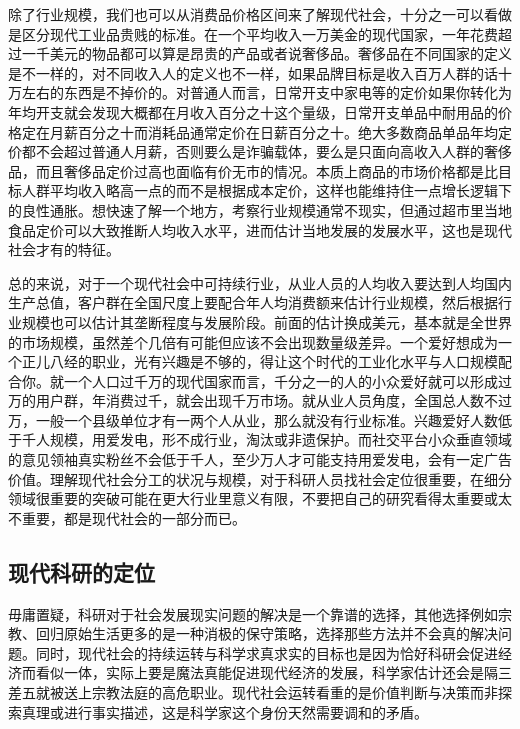 \documentclass[]{tufte-book}
\begin{document}
除了行业规模，我们也可以从消费品价格区间来了解现代社会，十分之一可以看做是区分现代工业品贵贱的标准。在一个平均收入一万美金的现代国家，一年花费超过一千美元的物品都可以算是昂贵的产品或者说奢侈品。奢侈品在不同国家的定义是不一样的，对不同收入人的定义也不一样，如果品牌目标是收入百万人群的话十万左右的东西是不掉价的。对普通人而言，日常开支中家电等的定价如果你转化为年均开支就会发现大概都在月收入百分之十这个量级，日常开支单品中耐用品的价格定在月薪百分之十而消耗品通常定价在日薪百分之十。绝大多数商品单品年均定价都不会超过普通人月薪，否则要么是诈骗载体，要么是只面向高收入人群的奢侈品，而且奢侈品定价过高也面临有价无市的情况。本质上商品的市场价格都是比目标人群平均收入略高一点的而不是根据成本定价，这样也能维持住一点增长逻辑下的良性通胀。想快速了解一个地方，考察行业规模通常不现实，但通过超市里当地食品定价可以大致推断人均收入水平，进而估计当地发展的发展水平，这也是现代社会才有的特征。

总的来说，对于一个现代社会中可持续行业，从业人员的人均收入要达到人均国内生产总值，客户群在全国尺度上要配合年人均消费额来估计行业规模，然后根据行业规模也可以估计其垄断程度与发展阶段。前面的估计换成美元，基本就是全世界的市场规模，虽然差个几倍有可能但应该不会出现数量级差异。一个爱好想成为一个正儿八经的职业，光有兴趣是不够的，得让这个时代的工业化水平与人口规模配合你。就一个人口过千万的现代国家而言，千分之一的人的小众爱好就可以形成过万的用户群，年消费过千，就会出现千万市场。就从业人员角度，全国总人数不过万，一般一个县级单位才有一两个人从业，那么就没有行业标准。兴趣爱好人数低于千人规模，用爱发电，形不成行业，淘汰或非遗保护。而社交平台小众垂直领域的意见领袖真实粉丝不会低于千人，至少万人才可能支持用爱发电，会有一定广告价值。理解现代社会分工的状况与规模，对于科研人员找社会定位很重要，在细分领域很重要的突破可能在更大行业里意义有限，不要把自己的研究看得太重要或太不重要，都是现代社会的一部分而已。

\hypertarget{ux73b0ux4ee3ux79d1ux7814ux7684ux5b9aux4f4d}{%
\subsection{现代科研的定位}\label{ux73b0ux4ee3ux79d1ux7814ux7684ux5b9aux4f4d}}

毋庸置疑，科研对于社会发展现实问题的解决是一个靠谱的选择，其他选择例如宗教、回归原始生活更多的是一种消极的保守策略，选择那些方法并不会真的解决问题。同时，现代社会的持续运转与科学求真求实的目标也是因为恰好科研会促进经济而看似一体，实际上要是魔法真能促进现代经济的发展，科学家估计还会是隔三差五就被送上宗教法庭的高危职业。现代社会运转看重的是价值判断与决策而非探索真理或进行事实描述，这是科学家这个身份天然需要调和的矛盾。
\end{document}
